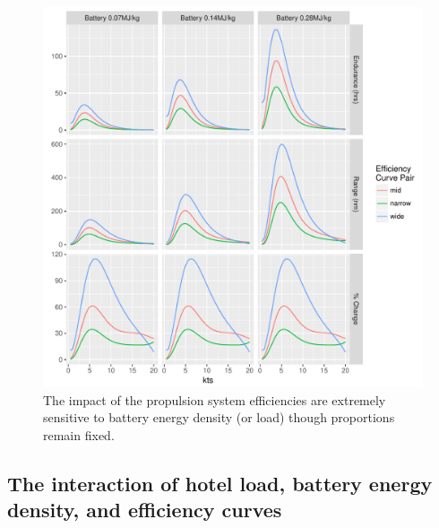 \documentclass{article}\usepackage[]{graphicx}\usepackage[]{color}
\makeatletter
\def\maxwidth{ %
  \ifdim\Gin@nat@width>\linewidth
    \linewidth
  \else
    \Gin@nat@width
  \fi
}
\newenvironment{knitrout}{}{} %
\makeatother
\begin{document}
\begin{figure}
\begin{knitrout}
\color{fgcolor}

{\centering \includegraphics[width=\maxwidth]{figures/plots-plot_sens_battery-1} 

}



\end{knitrout}
\caption{The impact of the propulsion system efficiencies are extremely sensitive to battery energy density (or load) though proportions remain fixed.}
\label{fig:sens_battery}
\end{figure}

\subsection{The interaction of hotel load, battery energy density, and efficiency curves}
\end{document}
